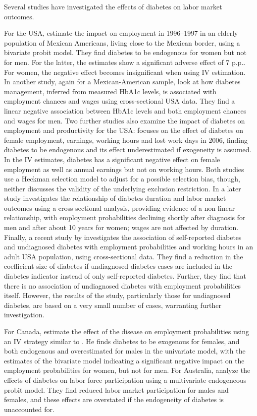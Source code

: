 \documentclass[12pt,english]{article}
\begin{document}
Several studies have investigated the effects of diabetes on labor market outcomes. 

For the \ac{USA}, \textcite{Brown2005} estimate  the impact on employment in 1996--1997 in an elderly population of Mexican Americans, living close to the Mexican border, using a bivariate probit model. They find diabetes to be endogenous for women but not for men.  For the latter, the estimates show a significant adverse effect of 7 \ac{p.p.}. For women, the negative effect becomes insignificant when using \ac{IV} estimation. In another study, again for a Mexican-American sample, \textcite{BrownIII2011} look at how diabetes management, inferred from measured \ac{HbA1c} levels, is associated with employment chances and wages using cross-sectional \ac{USA} data. They find a linear negative association between \ac{HbA1c} levels and both employment chances and wages for men. Two further studies also examine the impact of diabetes on employment and productivity for the \ac{USA}: \textcite{Minor2010} focuses on the effect of diabetes on female employment, earnings, working hours and lost work days in 2006, finding diabetes to be endogenous and its effect underestimated if exogeneity is assumed. In the \ac{IV} estimates, diabetes has a significant negative effect on female employment as well as annual earnings but not on working hours. Both studies use a Heckman selection model to adjust for a possible selection bias, though, neither discusses the validity of the underlying exclusion restriction. In a later study \textcite{Minor2013} investigates the relationship of diabetes duration and labor market outcomes using a cross-sectional analysis, providing evidence of a non-linear relationship, with employment probabilities declining shortly after diagnosis for men and after about 10 years for women; wages are not affected by duration. Finally, a recent study by \parencite{Minor2015} investigates the association of self-reported diabetes and undiagnosed diabetes with employment probabilities and working hours in an adult USA population, using cross-sectional data. They find a reduction in the coefficient size of diabetes if undiagnosed diabetes cases are included in the diabetes indicator instead of only self-reported diabetes. Further, they find that there is no association of undiagnosed diabetes with employment probabilities itself. However, the results of the study, particularly those for undiagnosed diabetes, are based on a very small number of cases, warranting further investigation.

For Canada, \textcite{Latif2009} estimate the effect of the disease on employment probabilities using an \ac{IV} strategy similar to \textcite{Brown2005}. He finds diabetes to be exogenous for females, and both endogenous and overestimated for males in the univariate model, with the estimates of the bivariate model indicating a significant negative impact on the employment probabilities for women, but not for men. For Australia, \cite{Zhang2009} analyze the effects of diabetes on labor force participation using a multivariate endogeneous probit model. They find reduced labor market participation for males and females, and these effects are overstated if the endogeneity of diabetes is unaccounted for. 
\end{document}
